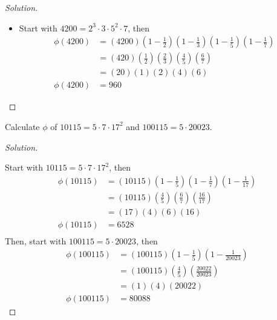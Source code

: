 \documentclass[11pt]{article}
\newenvironment{problem}[2][Problem]{\begin{trivlist}
\item[\hskip \labelsep {\bfseries #1}\hskip \labelsep {\bfseries #2.}]}{\end{trivlist}}
\newenvironment{solution}
  {\renewcommand\qedsymbol{$~$}\begin{proof}[Solution]$ $\par\nobreak\ignorespaces}
  {\end{proof}}
\begin{document}
\begin{solution}
\begin{itemize}
        \item [\textbf{4200}]
              Start with $4200=2^3\cdot 3\cdot 5^2\cdot 7$, then
              \begin{align*}
                  \phi(4200) & = (4200) \left(1-\frac{1}{2}\right)\left(1-\frac{1}{3}\right)\left(1-\frac{1}{5}\right)\left(1-\frac{1}{7}\right) \\
                             & = (420)\left(\frac{1}{2}\right)\left(\frac{2}{3}\right)\left(\frac{4}{5}\right)\left(\frac{6}{7}\right)           \\
                             & = (20) (1) (2) (4) (6)                                                                                            \\
                  \phi(4200) & = 960
              \end{align*}
    \end{itemize}
\end{solution}



\begin{problem}{3}
Calculate $\phi$ of $10115=5\cdot 7\cdot 17^2$ and $100115=5\cdot 20023$.
\end{problem}

\begin{solution}
    Start with $10115=5\cdot 7\cdot 17^2$, then
    \begin{align*}
        \phi(10115) & = (10115)\left(1-\frac{1}{5}\right)\left(1-\frac{1}{7}\right)\left(1-\frac{1}{17}\right) \\
                    & = (10115)\left(\frac{4}{5}\right)\left(\frac{6}{7}\right)\left(\frac{16}{17}\right)      \\
                    & = (17) (4) (6) (16)                                                                      \\
        \phi(10115) & = 6528                                                                                   \\
    \end{align*}
    Then, start with $100115=5\cdot 20023$, then
    \begin{align*}
        \phi(100115) & = (100115)\left(1-\frac{1}{5}\right)\left(1-\frac{1}{20023}\right) \\
                     & = (100115)\left(\frac{4}{5}\right)\left(\frac{20022}{20023}\right) \\
                     & = (1) (4) (20022)                                                  \\
        \phi(100115) & =  80088
    \end{align*}
\end{solution}
\end{document}
